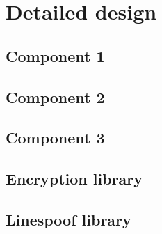 \section{Detailed design}

\subsection{Component 1}
\subsection{Component 2}
\subsection{Component 3}
\subsection{Encryption library}
\subsection{Linespoof library}

